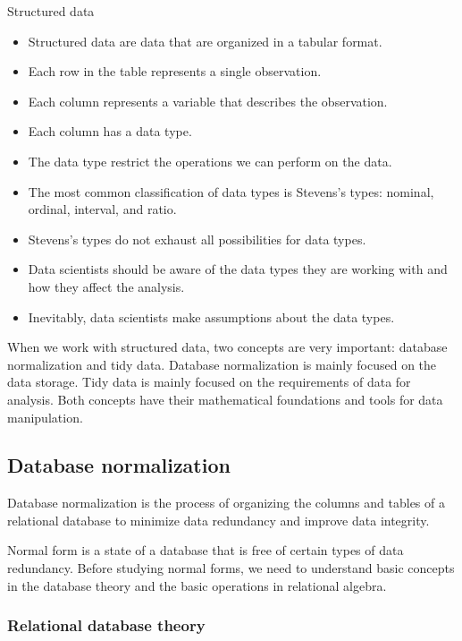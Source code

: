 \begin{slidebox}{Structured data}{}
  \begin{itemize}
    \item Structured data are data that are organized in a tabular format.
    \item Each row in the table represents a single observation.
    \item Each column represents a variable that describes the observation.
    \item Each column has a data type.
    \item The data type restrict the operations we can perform on the data.
    \item The most common classification of data types is Stevens’s types: nominal,
      ordinal, interval, and ratio.
    \item Stevens’s types do not exhaust all possibilities for data types.
    \item Data scientists should be aware of the data types they are working with and
      how they affect the analysis.
    \item Inevitably, data scientists make assumptions about the data types.
  \end{itemize}
\end{slidebox}

When we work with structured data, two concepts are very important: database normalization
and tidy data.  Database normalization is mainly focused on the data storage.  Tidy data is
mainly focused on the requirements of data for analysis.  Both concepts have their
mathematical foundations and tools for data manipulation.

\subsection{Database normalization}

Database normalization is the process of organizing the columns and tables of a relational
database to minimize data redundancy and improve data integrity.

Normal form is a state of a database that is free of certain types of data redundancy.
Before studying normal forms, we need to understand basic concepts in the database theory
and the basic operations in relational algebra.

\subsubsection{Relational database theory}

